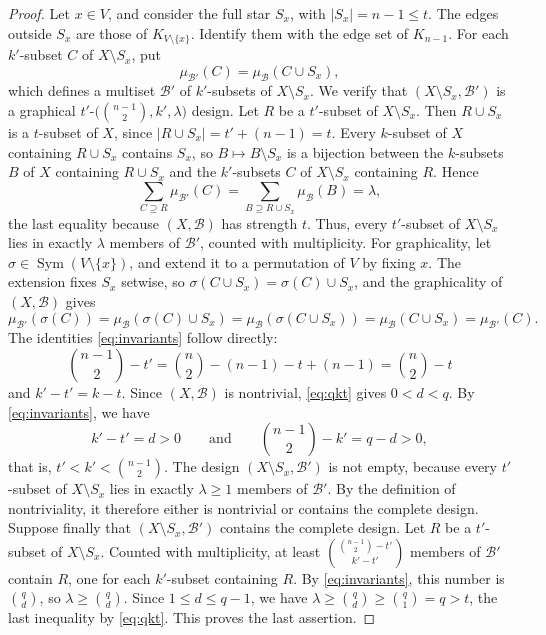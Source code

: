 \documentclass[10pt,a4paper]{amsart}
\DeclareMathOperator{\Sym}{Sym}
\newcommand{\cB}{\mathcal{B}}
\begin{document}
\begin{proof}
Let $x \in V$, and consider the full star $S_x$, with $|S_x| = n - 1 \leq
t$. The edges outside $S_x$ are those of $K_{V \setminus \{x\}}$. Identify
them with the edge set of $K_{n-1}$. For each $k'$-subset $C$ of $X
\setminus S_x$, put
\[
\mu_{\cB'}(C) = \mu_{\cB}(C \cup S_x),
\]
which defines a multiset $\cB'$ of $k'$-subsets of $X \setminus S_x$. We
verify that $(X \setminus S_x, \cB')$ is a graphical
$t'$-$\bigl(\binom{n-1}{2}, k', \lambda\bigr)$ design. Let $R$ be a
$t'$-subset of $X \setminus S_x$. Then $R \cup S_x$ is a $t$-subset of $X$,
since $|R \cup S_x| = t' + (n - 1) = t$. Every $k$-subset of $X$ containing
$R \cup S_x$ contains $S_x$, so $B \mapsto B \setminus S_x$ is a bijection
between the $k$-subsets $B$ of $X$ containing $R \cup S_x$ and the
$k'$-subsets $C$ of $X \setminus S_x$ containing $R$. Hence
\[
\sum_{C \supseteq R} \mu_{\cB'}(C) = \sum_{B \supseteq R \cup S_x} \mu_{\cB}(B)
= \lambda,
\]
the last equality because $(X, \cB)$ has strength $t$. Thus, every
$t'$-subset of $X \setminus S_x$ lies in exactly $\lambda$ members of
$\cB'$, counted with multiplicity. For graphicality, let $\sigma \in \Sym(V
\setminus \{x\})$, and extend it to a permutation of $V$ by fixing $x$. The
extension fixes $S_x$ setwise, so $\sigma(C \cup S_x) = \sigma(C) \cup S_x$,
and the graphicality of $(X, \cB)$ gives
\[
\mu_{\cB'}(\sigma(C)) = \mu_{\cB}(\sigma(C) \cup S_x) = \mu_{\cB}(\sigma(C \cup S_x))
= \mu_{\cB}(C \cup S_x) = \mu_{\cB'}(C).
\]
The identities \eqref{eq:invariants} follow directly:
\[
\binom{n - 1}{2} - t'
= \binom{n}{2} - (n - 1) - t + (n - 1)
= \binom{n}{2} - t
\]
and $k' - t' = k - t$. Since $(X, \cB)$ is nontrivial, \eqref{eq:qkt} gives
$0 < d < q$. By \eqref{eq:invariants}, we have
\[
k' - t' = d > 0
\qquad \text{and} \qquad
\binom{n - 1}{2} - k' = q - d > 0,
\]
that is, $t' < k' < \binom{n-1}{2}$. The design $(X \setminus S_x, \cB')$ is
not empty, because every $t'$-subset of $X \setminus S_x$ lies in exactly
$\lambda \geq 1$ members of $\cB'$. By the definition of nontriviality, it
therefore either is nontrivial or contains the complete design. Suppose
finally that $(X \setminus S_x, \cB')$ contains the complete design. Let $R$
be a $t'$-subset of $X \setminus S_x$. Counted with multiplicity, at least
$\binom{\binom{n-1}{2} - t'}{k' - t'}$ members of $\cB'$ contain $R$, one
for each $k'$-subset containing $R$. By \eqref{eq:invariants}, this number
is $\binom{q}{d}$, so $\lambda \geq \binom{q}{d}$. Since $1 \leq d \leq q -
1$, we have $\lambda \geq \binom{q}{d} \geq \binom{q}{1} = q > t$, the last
inequality by \eqref{eq:qkt}. This proves the last assertion.
\end{proof}
\end{document}
